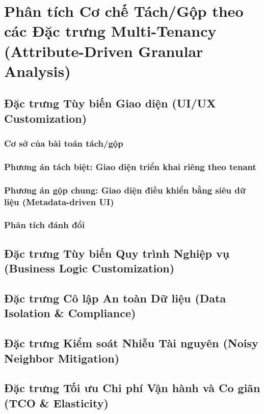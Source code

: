 \par{}
\section{Phân tích Cơ chế Tách/Gộp theo các Đặc trưng Multi-Tenancy (Attribute-Driven Granular Analysis)}
\label{outline:2:tradeoffs:1}

\par{}
\subsection{Đặc trưng Tùy biến Giao diện (UI/UX Customization)}
\label{outline:2:tradeoffs:2}

\par{}
\subsubsection{Cơ sở của bài toán tách/gộp}
\label{outline:2:tradeoffs:3}

\par{}
\subsubsection{Phương án tách biệt: Giao diện triển khai riêng theo tenant}
\label{outline:2:tradeoffs:4}

\par{}
\subsubsection{Phương án gộp chung: Giao diện điều khiển bằng siêu dữ liệu (Metadata-driven UI)}
\label{outline:2:tradeoffs:5}

\par{}
\subsubsection{Phân tích đánh đổi}
\label{outline:2:tradeoffs:6}

\par{}
\subsection{Đặc trưng Tùy biến Quy trình Nghiệp vụ (Business Logic Customization)}
\label{outline:2:tradeoffs:7}

\par{}
\subsection{Đặc trưng Cô lập An toàn Dữ liệu (Data Isolation \& Compliance)}
\label{outline:2:tradeoffs:8}

\par{}
\subsection{Đặc trưng Kiểm soát Nhiễu Tài nguyên (Noisy Neighbor Mitigation)}
\label{outline:2:tradeoffs:9}

\par{}
\subsection{Đặc trưng Tối ưu Chi phí Vận hành và Co giãn (TCO \& Elasticity)}
\label{outline:2:tradeoffs:10}
